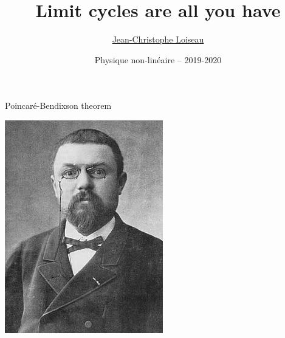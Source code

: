 \documentclass[usenames,dvipsnames,svgnames,10pt,aspectratio=169]{beamer}
\title[Nonlinear physics] %
{
	Limit cycles are all you have
}
\author[J.-Ch.~Loiseau] %
{
	\underline{Jean-Christophe Loiseau}
}
\institute[unused]
{
	\url{jean-christophe.loiseau@ensam.eu} \\
	Laboratoire DynFluid \\
	Arts et M\'etiers, France.
}
\date[unused]{Physique non-lin\'eaire -- 2019-2020}
\begin{document}
\titleframe	%


\begin{frame}[t, c]{Poincaré-Bendixson theorem}{}
  \begin{minipage}{.48\textwidth}
    \centering
    \includegraphics[height=.5\textheight]{poincare}

    \bigskip


\end{minipage}
\end{frame}
\end{document}
